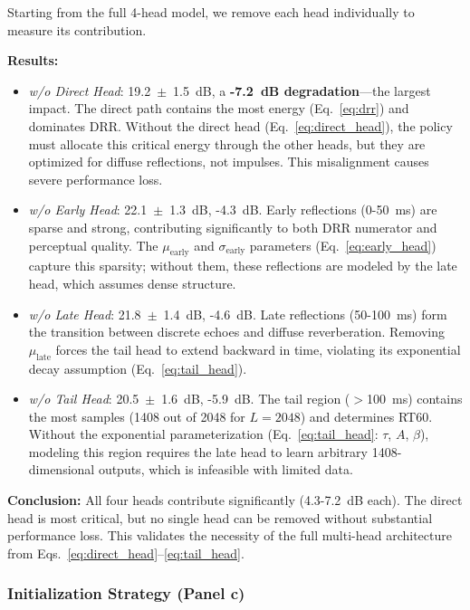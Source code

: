 \documentclass[12pt,a4paper]{article}
\begin{document}
Starting from the full 4-head model, we remove each head individually to measure its contribution.

\textbf{Results:}
\begin{itemize}
\item \textit{w/o Direct Head}: 19.2~$\pm$~1.5~dB, a \textbf{-7.2~dB degradation}---the largest impact. The direct path contains the most energy (Eq.~\eqref{eq:drr}) and dominates DRR. Without the direct head (Eq.~\eqref{eq:direct_head}), the policy must allocate this critical energy through the other heads, but they are optimized for diffuse reflections, not impulses. This misalignment causes severe performance loss.

\item \textit{w/o Early Head}: 22.1~$\pm$~1.3~dB, -4.3~dB. Early reflections (0-50~ms) are sparse and strong, contributing significantly to both DRR numerator and perceptual quality. The $\mu_\text{early}$ and $\sigma_\text{early}$ parameters (Eq.~\eqref{eq:early_head}) capture this sparsity; without them, these reflections are modeled by the late head, which assumes dense structure.

\item \textit{w/o Late Head}: 21.8~$\pm$~1.4~dB, -4.6~dB. Late reflections (50-100~ms) form the transition between discrete echoes and diffuse reverberation. Removing $\mu_\text{late}$ forces the tail head to extend backward in time, violating its exponential decay assumption (Eq.~\eqref{eq:tail_head}).

\item \textit{w/o Tail Head}: 20.5~$\pm$~1.6~dB, -5.9~dB. The tail region ($>$100~ms) contains the most samples (1408 out of 2048 for $L=2048$) and determines RT60. Without the exponential parameterization (Eq.~\eqref{eq:tail_head}: $\tau$, $A$, $\beta$), modeling this region requires the late head to learn arbitrary 1408-dimensional outputs, which is infeasible with limited data.
\end{itemize}

\textbf{Conclusion:} All four heads contribute significantly (4.3-7.2~dB each). The direct head is most critical, but no single head can be removed without substantial performance loss. This validates the necessity of the full multi-head architecture from Eqs.~\eqref{eq:direct_head}--\eqref{eq:tail_head}.

\subsubsection{Initialization Strategy (Panel c)}
\end{document}
